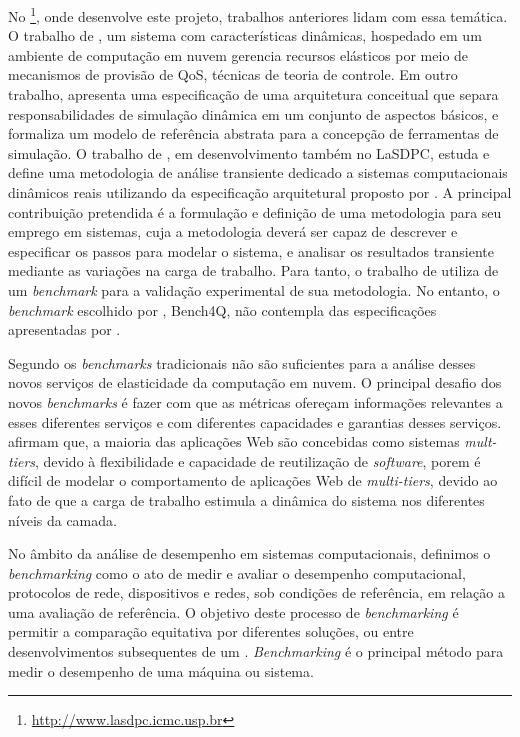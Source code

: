 No \textit{}\footnote{\url{http://www.lasdpc.icmc.usp.br}}, onde desenvolve este projeto, trabalhos anteriores lidam com essa temática. O trabalho de , um sistema com características dinâmicas, hospedado em um ambiente de computação em nuvem gerencia recursos elásticos por meio de mecanismos de provisão de QoS, técnicas de teoria de controle. Em outro trabalho,  apresenta uma especificação de uma arquitetura conceitual que separa responsabilidades de simulação dinâmica em um conjunto de aspectos básicos, e formaliza um modelo de referência abstrata para a concepção de ferramentas de simulação. O trabalho de , em desenvolvimento também no LaSDPC, estuda e define uma metodologia de análise transiente dedicado a sistemas computacionais dinâmicos reais utilizando da especificação arquitetural proposto por . A principal contribuição pretendida é a formulação e definição de uma metodologia para seu emprego em sistemas, cuja a metodologia deverá ser capaz de descrever e especificar os passos para modelar o sistema, e analisar os resultados transiente mediante as variações na carga de trabalho. Para tanto, o trabalho de  utiliza de um \textit{benchmark} para a validação experimental de sua metodologia. No entanto, o \textit{benchmark} escolhido por , Bench4Q, não contempla das especificações apresentadas por .

Segundo  os \textit{benchmarks} tradicionais não são suficientes para a análise desses novos serviços de elasticidade da computação em nuvem. O principal desafio dos novos \textit{benchmarks} é fazer com que as métricas ofereçam informações relevantes a esses diferentes serviços e com diferentes capacidades e garantias desses serviços.  afirmam que, a maioria das aplicações Web são concebidas como sistemas \textit{mult-tiers}, devido à flexibilidade e capacidade de reutilização de \textit{software}, porem é difícil de modelar o comportamento de aplicações Web de \textit{multi-tiers}, devido ao fato de que a carga de trabalho estimula a dinâmica do sistema nos diferentes níveis da camada.

No âmbito da análise de desempenho em sistemas computacionais, definimos o \textit{benchmarking} como o ato de medir e avaliar o desempenho computacional, protocolos de rede, dispositivos e redes, sob condições de referência, em relação a uma avaliação de referência. O objetivo deste processo de \textit{benchmarking} é permitir a comparação equitativa por diferentes soluções, ou entre desenvolvimentos subsequentes de um \textit{}. \textit{Benchmarking} é o principal método para medir o desempenho de uma máquina ou sistema.

